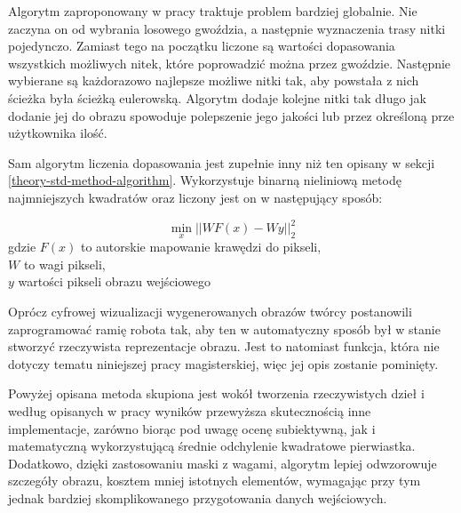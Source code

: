 \documentclass[a4paper, 12pt, polish, twoside]{extreport}
\begin{document}
        Algorytm zaproponowany w pracy traktuje problem bardziej globalnie. Nie zaczyna on od wybrania losowego gwoździa, a następnie wyznaczenia trasy nitki pojedynczo. Zamiast tego na początku liczone są wartości dopasowania wszystkich możliwych nitek, które poprowadzić można przez gwoździe. Następnie wybierane są każdorazowo najlepsze możliwe nitki tak, aby powstała z nich ścieżka była ścieżką eulerowską. Algorytm dodaje kolejne nitki tak długo jak dodanie jej do obrazu spowoduje polepszenie jego jakości lub przez określoną prze użytkownika ilość.
        
        Sam algorytm liczenia dopasowania jest zupełnie inny niż ten opisany w sekcji \ref{theory-std-method-algorithm}. Wykorzystuje binarną nieliniową metodę najmniejszych kwadratów oraz liczony jest on w następujący sposób:
        
        \begin{equation} \label{others-birsak-penalty}
            \min_x ||WF(x) - Wy||_2^2
        \end{equation}
        gdzie \(F(x)\) to autorskie mapowanie krawędzi do pikseli, \\
        \(W\) to wagi pikseli, \\
        \(y\) wartości pikseli obrazu wejściowego 
        
        Oprócz cyfrowej wizualizacji wygenerowanych obrazów twórcy postanowili zaprogramować ramię robota tak, aby ten w automatyczny sposób był w stanie stworzyć rzeczywista reprezentacje obrazu. Jest to natomiast funkcja, która nie dotyczy tematu niniejszej pracy magisterskiej, więc jej opis zostanie pominięty. 

        Powyżej opisana metoda skupiona jest wokół tworzenia rzeczywistych dzieł i według opisanych w pracy wyników przewyższa skutecznością inne implementacje, zarówno biorąc pod uwagę ocenę subiektywną, jak i matematyczną wykorzystującą średnie odchylenie kwadratowe pierwiastka. Dodatkowo, dzięki zastosowaniu maski z wagami, algorytm lepiej odwzorowuje szczegóły obrazu, kosztem mniej istotnych elementów, wymagając przy tym jednak bardziej skomplikowanego przygotowania danych wejściowych.
        
\end{document}
